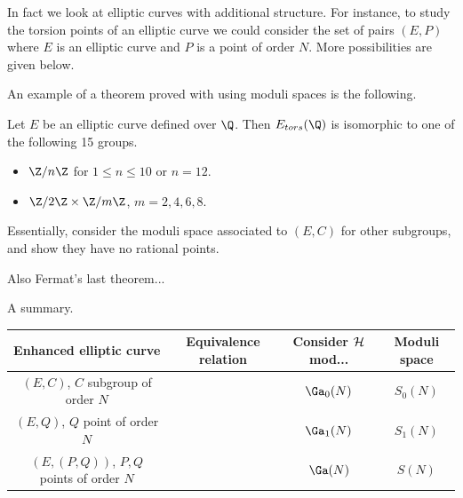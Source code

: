 In fact we look at elliptic curves with additional structure.
For instance, to study the torsion points of an elliptic curve we could consider the set of pairs $(E,P)$ where $E$ is an elliptic curve and $P$ is a point of order $N$. More possibilities are given below.

An example of a theorem proved with using moduli spaces is the following.
\begin{thm}[Mazur]
Let $E$ be an elliptic curve defined over $\Q$. Then $E_{tors}(\Q)$ is isomorphic to one of the following 15 groups.
\begin{itemize}
\item
$\Z/n\Z$ for $1\le n\le 10$ or $n=12$.
\item
$\Z/2\Z\times \Z/m\Z$, $m=2,4,6,8$.
\end{itemize}
\end{thm}
Essentially, consider the moduli space associated to $(E,C)$ for other subgroups, and show they have no rational points.

Also Fermat's last theorem...

A summary.

\begin{tabular}{|c|c|c|c|}
\hline
Enhanced elliptic curve & Equivalence relation &Consider $\cal H$ mod...&Moduli space\\
\hline
$(E,C)$, $C$ subgroup of order $N$ & & $\Ga_0(N)$ & $S_0(N)$\\
\hline$(E,Q)$, $Q$ point of order $N$ & & $\Ga_1(N)$ & $S_1(N)$\\
\hline$(E,(P,Q))$, $P,Q$ points of order $N$& &$\Ga(N)$& $S(N)$\\
\hline
\end{tabular}
